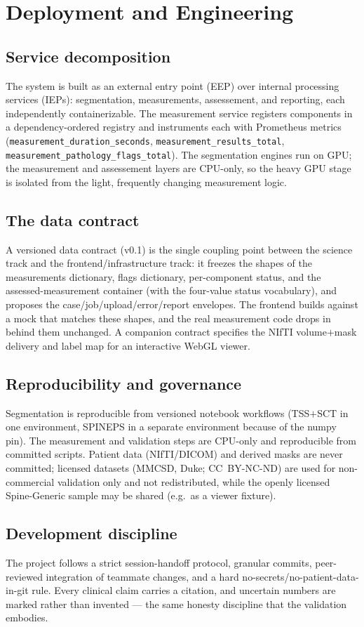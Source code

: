 \section{Deployment and Engineering}
\label{sec:deploy}

\subsection{Service decomposition}
The system is built as an external entry point (EEP) over internal processing services (IEPs):
segmentation, measurements, assessement, and reporting, each independently containerizable. The
measurement service registers components in a dependency-ordered registry and instruments each with
Prometheus metrics (\texttt{measurement\_duration\_seconds}, \texttt{measurement\_results\_total},
\texttt{measurement\_pathology\_flags\_total}). The segmentation engines run on GPU; the measurement and
assessement layers are CPU-only, so the heavy GPU stage is isolated from the light, frequently changing
measurement logic.

\subsection{The data contract}
A versioned data contract (v0.1) is the single coupling point between the science track and the
frontend/infrastructure track: it freezes the shapes of the measurements dictionary, flags dictionary,
per-component status, and the assessed-measurement container (with the four-value status vocabulary),
and proposes the case/job/upload/error/report envelopes. The frontend builds against a mock that matches
these shapes, and the real measurement code drops in behind them unchanged. A companion contract specifies
the NIfTI volume$+$mask delivery and label map for an interactive WebGL viewer.

\subsection{Reproducibility and governance}
Segmentation is reproducible from versioned notebook workflows (TSS$+$SCT in one environment, SPINEPS in a
separate environment because of the numpy pin). The measurement and validation steps are CPU-only and
reproducible from committed scripts. Patient data (NIfTI/DICOM) and derived masks are never committed;
licensed datasets (MMCSD, Duke; CC~BY-NC-ND) are used for non-commercial validation only and not
redistributed, while the openly licensed Spine-Generic sample may be shared (e.g.\ as a viewer fixture).

\subsection{Development discipline}
The project follows a strict session-handoff protocol, granular commits, peer-reviewed integration of
teammate changes, and a hard no-secrets/no-patient-data-in-git rule. Every clinical claim carries a
citation, and uncertain numbers are marked rather than invented --- the same honesty discipline that the
validation embodies.
